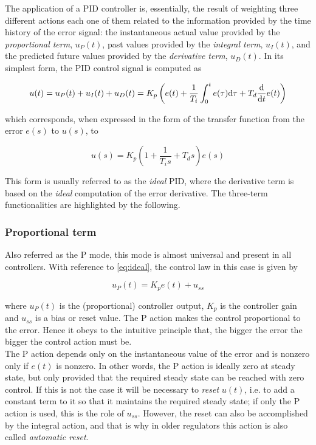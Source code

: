 The application of a PID controller is, essentially, the result of weighting three different actions each one of them related to the information provided by the time history of the error signal: the instantaneous actual value provided by the  \emph{proportional term}, $u_P(t)$, past values provided by the \emph{integral term}, $u_I(t)$, and the predicted future values provided by the \emph{derivative term}, $u_D(t)$.  In its simplest form, the PID control signal is computed as

\begin{equation}
u(t)=u_P(t)+u_I(t)+u_D(t)= K_p \left ( e(t)+\frac{1}{T_i}\int_0^t e(\tau)\mathrm{d} \tau+T_d\frac{\mathrm{d}}{\mathrm{d} t}e(t) \right )
\end{equation}

\noindent which corresponds, when expressed in the form of the transfer function from the error $e(s)$ to $u(s)$, to

\begin{equation}
u(s)=K_p \left ( 1+\frac{1}{T_is}+{T_ds} \right )  e(s)
\label{eq:ideal}
\end{equation}

This form is usually referred to as the \emph{ideal} PID, where the derivative term is based on the \emph{ideal} computation of the error derivative. The three-term functionalities are highlighted by the following.

\subsubsection*{Proportional term}

Also referred as the P mode, this mode is almost universal and present in all controllers. With reference to \eqref{eq:ideal}, the control law in this case is given by

\[u_P (t) = K_pe(t) + u_{ss}\]

\noindent where $u_P(t)$ is the (proportional) controller output, $K_p$ is the controller gain and $u_{ss}$ is a bias or reset value. The P action makes the control proportional to the error. Hence it obeys to the intuitive principle that, the bigger the error the bigger the control action must be.\\

The P action depends only on the instantaneous value of the error and is nonzero only if $e(t)$ is nonzero. In other words, the P action is ideally zero at steady state, but only provided that the required steady state can be reached with zero control. If this is not the case it will be necessary to \emph{reset} $u(t)$, i.e. to add a constant term to it so that it maintains the required steady state; if only the P action is used, this is the role of $u_{ss}$. However, the reset can also be accomplished by the integral action, and that is why  in older regulators this action is also called \emph{automatic reset}. 


